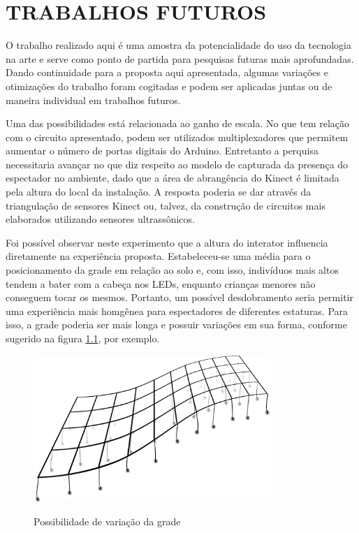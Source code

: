 \chapter{TRABALHOS FUTUROS}

O trabalho realizado aqui é uma amostra da potencialidade do uso da tecnologia na arte e serve como ponto de partida para pesquisas futuras mais aprofundadas. Dando continuidade para a proposta aqui apresentada, algumas variações e otimizações do trabalho foram cogitadas e podem ser aplicadas juntas ou de maneira individual em trabalhos futuros.

Uma das possibilidades está relacionada ao ganho de escala. No que tem relação com o circuito apresentado, podem ser utilizados multiplexadores que permitem aumentar o número de portas digitais do Arduino. Entretanto a perquisa necessitaria avançar no que diz respeito ao modelo de capturada da presença do espectador no ambiente, dado que a área de abrangência do Kinect é limitada pela altura do local da instalação. A resposta poderia se dar através da triangulação de sensores Kinect ou, talvez, da construção de circuitos mais elaborados utilizando sensores ultrassônicos. 

Foi possível observar neste experimento que a altura do interator influencia diretamente na experiência proposta. Estabeleceu-se uma média para o posicionamento da grade em relação ao solo e, com isso, indivíduos mais altos tendem a bater com a cabeça nos LEDs, enquanto crianças menores não conseguem tocar os mesmos. Portanto, um possível desdobramento seria permitir uma experiência mais homgênea para espectadores de diferentes estaturas. Para isso, a grade poderia ser mais longa e possuir variações em sua forma, conforme sugerido na figura \ref{fig:malha_futuro}, por exemplo. 

\begin{figure}[H]
    \centering
    \caption{Possibilidade de variação da grade}
	\vspace*{0,2cm}
    \includegraphics[width=0.8\textwidth]{./04-figuras/malha_futuro}
    \label{fig:malha_futuro}
\end{figure}
\vspace*{-0,9cm}
{\raggedright {}}\\


